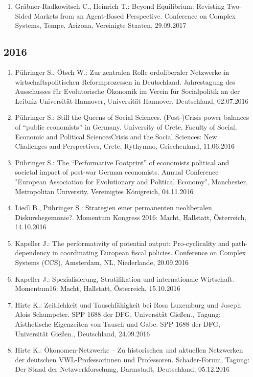 \begin{enumerate}
	\item Gräbner-Radkowitsch C., Heinrich T.: Beyond Equilibrium: Revisting Two-Sided Markets from an Agent-Based Perspective. Conference on Complex Systems, Tempe, Arizona, Vereinigte Staaten, 29.09.2017
\end{enumerate}
\subsection*{2016}

\begin{enumerate}
	\item Pühringer S., Ötsch W.: Zur zentralen Rolle ordoliberaler Netzwerke in wirtschaftspolitischen Reformprozessen in Deutschland. Jahrestagung des Ausschusses für Evolutorische Ökonomik im Verein für Socialpolitik an der Leibniz Universität Hannover, Universität Hannover, Deutschland, 02.07.2016
	\item Pühringer S.: Still the Queens of Social Sciences. (Post-)Crisis power balances  of “public economists” in Germany. University of Crete, Faculty of Social, Economic and Political SciencesCrisis and the Social Sciences: New Challenges and Perspectives, Crete, Rythymno, Griechenland, 11.06.2016
	\item Pühringer S.: The “Performative Footprint” of economists political and societal impact of post-war German economists. Annual Conference "European Association for Evolutionary and Political Economy", Manchester, Metropolitan University, Vereinigtes Königreich, 04.11.2016
	\item Liedl B., Pühringer S.: Strategien einer permanenten neoliberalen Diskurshegemonie?. Momentum Kongress 2016: Macht, Hallstatt, Österreich, 14.10.2016
	\item Kapeller J.: The performativity of potential output: Pro-cyclicality and path-dependency in coordinating European fiscal policies. Conference on Complex Systems (CCS), Amsterdam, NL, Niederlande, 20.09.2016
	\item Kapeller J.: Spezialisierung, Stratifikation und internationale Wirtschaft. Momentum16: Macht, Hallstatt, Österreich, 15.10.2016
	\item Hirte K.: Zeitlichkeit und Tauschfähigkeit bei Rosa Luxemburg und Joseph Alois Schumpeter. SPP 1688 der DFG, Universität Gießen., Tagung: Aisthetische Eigenzeiten von Tausch und Gabe. SPP 1688 der DFG, Universität Gießen., Deutschland, 24.09.2016
	\item Hirte K.: Ökonomen-Netzwerke – Zu historischen und aktuellen Netzwerken der deutschen VWL-Professorinnen und Professoren. Schader-Forum, Tagung: Der Stand der Netzwerkforschung, Darmstadt, Deutschland, 05.12.2016

\end{enumerate}

